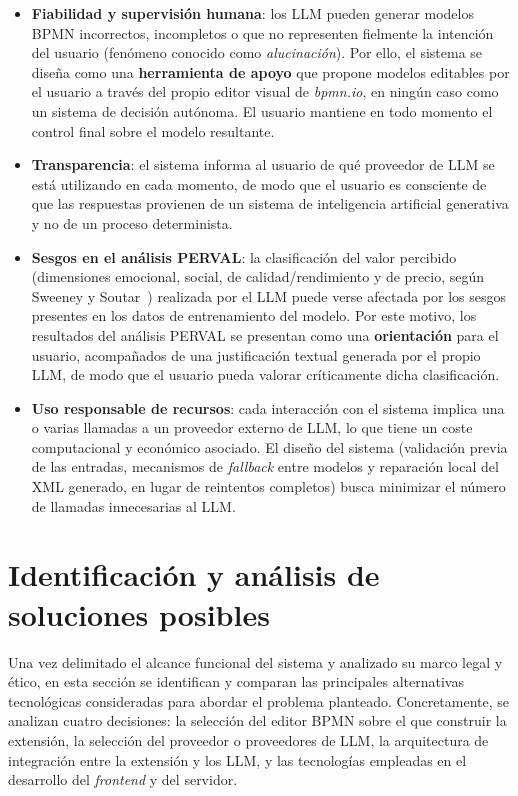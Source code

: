 {\begin{itemize}
    \item \textbf{Fiabilidad y supervisión humana}: los LLM pueden generar modelos BPMN incorrectos, incompletos o que no representen fielmente la intención del usuario (fenómeno conocido como \textit{alucinación}). Por ello, el sistema se diseña como una \textbf{herramienta de apoyo} que propone modelos editables por el usuario a través del propio editor visual de \textit{bpmn.io}, en ningún caso como un sistema de decisión autónoma. El usuario mantiene en todo momento el control final sobre el modelo resultante.
    \item \textbf{Transparencia}: el sistema informa al usuario de qué proveedor de LLM se está utilizando en cada momento, de modo que el usuario es consciente de que las respuestas provienen de un sistema de inteligencia artificial generativa y no de un proceso determinista.
    \item \textbf{Sesgos en el análisis PERVAL}: la clasificación del valor percibido (dimensiones emocional, social, de calidad/rendimiento y de precio, según Sweeney y Soutar~\cite{sweeney2001perval}) realizada por el LLM puede verse afectada por los sesgos presentes en los datos de entrenamiento del modelo. Por este motivo, los resultados del análisis PERVAL se presentan como una \textbf{orientación} para el usuario, acompañados de una justificación textual generada por el propio LLM, de modo que el usuario pueda valorar críticamente dicha clasificación.
    \item \textbf{Uso responsable de recursos}: cada interacción con el sistema implica una o varias llamadas a un proveedor externo de LLM, lo que tiene un coste computacional y económico asociado. El diseño del sistema (validación previa de las entradas, mecanismos de \textit{fallback} entre modelos y reparación local del XML generado, en lugar de reintentos completos) busca minimizar el número de llamadas innecesarias al LLM.
\end{itemize}

\section{Identificación y análisis de soluciones posibles}
\label{sec:solucionesPosibles}

Una vez delimitado el alcance funcional del sistema y analizado su marco legal y ético, en esta sección se identifican y comparan las principales alternativas tecnológicas consideradas para abordar el problema planteado. Concretamente, se analizan cuatro decisiones: la selección del editor BPMN sobre el que construir la extensión, la selección del proveedor o proveedores de LLM, la arquitectura de integración entre la extensión y los LLM, y las tecnologías empleadas en el desarrollo del \textit{frontend} y del servidor.

}
